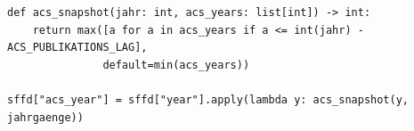 %
%
%
%
%
%



\begin{lstlisting}[style=pythonstil,
  label={lst:acs-versatz},
  caption={Zeitbewusste Zuordnung des ACS-Jahrgangs
           (\texttt{prep/s1\_daten.py}, Z.~306--322 und 337, gekürzt)}]
def acs_snapshot(jahr: int, acs_years: list[int]) -> int:
    return max([a for a in acs_years if a <= int(jahr) - ACS_PUBLIKATIONS_LAG],
               default=min(acs_years))

sffd["acs_year"] = sffd["year"].apply(lambda y: acs_snapshot(y, jahrgaenge))
\end{lstlisting}

